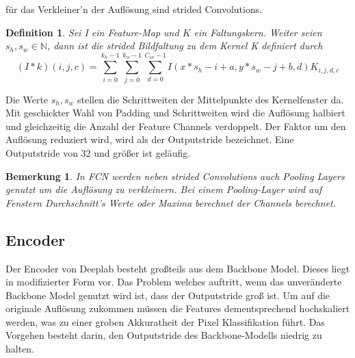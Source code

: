 \documentclass[12pt,DIV=15,BCOR=15mm,twoside,headsepline,abstract=true,listof=totoc,bibliography=totoc]{scrreprt}
\newtheorem{remark}{Bemerkung}[chapter]
\newtheorem{defi}{Definition}
\theoremstyle{remark}    %
\begin{document}
    für das Verkleiner'n der Auflösung sind strided Convolutions.
    \begin{defi}
    Sei I ein Feature-Map und $K$ ein Faltungskern. Weiter seien $s_h, s_w \in \mathbb{N}$, dann ist die 
    strided Bildfaltung zu dem Kernel K definiert durch 
    \[
    (I * k)(i, j, c) = \sum_{i =0}^{k_h-1}\sum_{j=0}^{k_w-1} \sum_{d = 0}^{C_{in}-1}I(x *s_h-i +a, y*s_w-j+b, d)K_{i,j,d,c}
    \]
    \end{defi}\noindent
    Die Werte $s_h, s_w$ stellen die Schrittweiten der Mittelpunkte des Kernelfenster da. Mit geschickter Wahl von Padding und Schrittweiten wird 
    die Auflösung halbiert und gleichzeitig die Anzahl der Feature Channels verdoppelt. Der Faktor um den Auflösung reduziert 
    wird, wird als der Outputstride bezeichnet. Eine Outputstride von 32 und größer ist geläufig. 
    \begin{remark}
    In \ac{FCN} werden neben strided Convolutions auch Pooling Layers genutzt um die Auflösung zu verkleinern. Bei einem Pooling-Layer wird auf Fenstern
    Durchschnitt's Werte oder Maxima berechnet der Channels berechnet.
    \end{remark}

    \subsection{Encoder}
    Der Encoder von Deeplab besteht großteils aus dem Backbone Model. Dieses liegt in modifizierter Form vor. 
    Das Problem welches auftritt, wenn das unveränderte Backbone Model genutzt wird ist, dass der Outputstride groß ist. Um auf die originale Auflösung 
    zukommen müssen die  Features dementsprechend hochskaliert werden, was zu einer groben Akkuratheit der Pixel Klassifikation führt. 
    Das Vorgehen besteht darin, den Outputstride des Backbone-Modells niedrig zu halten.
\end{document}

